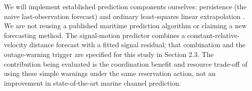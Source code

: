 We will implement established prediction components ourselves: persistence (the naive last-observation forecast) \cite{hyndman2021forecasting} and ordinary least-squares linear extrapolation \cite{nistLeastSquares}. We are not reusing a published maritime prediction algorithm or claiming a new forecasting method. The signal-motion predictor combines a constant-relative-velocity distance forecast with a fitted signal residual; that combination and the outage-warning trigger are specified for this study in Section 2.3. The contribution being evaluated is the coordination benefit and resource trade-off of using these simple warnings under the same reservation action, not an improvement in state-of-the-art marine channel prediction.
